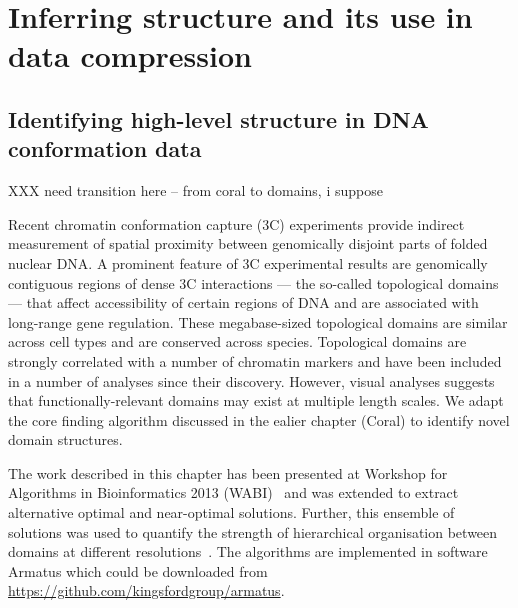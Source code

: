 \documentclass[12pt]{cmuthesis}
\begin{document}
\part{Inferring structure and its use in data compression}


\chapter{Identifying high-level structure in DNA conformation data}

XXX need transition here -- from coral to domains, i suppose


Recent chromatin conformation capture (3C) experiments provide indirect measurement of spatial proximity between genomically disjoint parts of folded nuclear DNA. A prominent feature of 3C experimental results are genomically contiguous regions of dense 3C interactions --- the so-called topological domains --- that affect accessibility of certain regions of DNA and are associated with long-range gene regulation. These megabase-sized topological domains are similar across cell types and are conserved across species. Topological domains are strongly correlated with a number of chromatin markers and have been included in a number of analyses since their discovery. However, visual analyses suggests that functionally-relevant domains may exist at multiple length scales. We adapt the core finding algorithm discussed in the ealier chapter (Coral) to identify novel domain structures.







The work described in this chapter has been presented at Workshop for Algorithms in Bioinformatics 2013 (WABI)~\cite{Filippova2013} and was extended to extract alternative optimal and near-optimal solutions. Further, this ensemble of solutions was used to quantify the strength of hierarchical organisation between domains at different resolutions~\cite{ArmatusAMB}. The algorithms are implemented in software Armatus which could be downloaded from \url{https://github.com/kingsfordgroup/armatus}.
\end{document}
